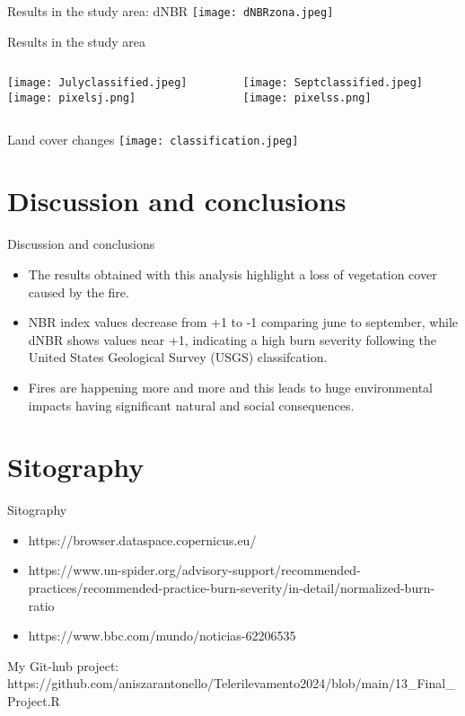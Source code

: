 \documentclass{beamer}
\begin{document}
\begin{frame}{Results in the study area: dNBR}
\texttt{[image: dNBRzona.jpeg]}
\end{frame}

\begin{frame}{Results in the study area}
\begin{columns}
    \begin{column}{0.5\textwidth}
        \texttt{[image: Julyclassified.jpeg]}
        \texttt{[image: pixelsj.png]}
    \end{column}
    \begin{column}{0.5\textwidth}
    \texttt{[image: Septclassified.jpeg]}
    \texttt{[image: pixelss.png]}
    \end{column}
\end{columns}
\end{frame}

\begin{frame}{Land cover changes}
\texttt{[image: classification.jpeg]}
\end{frame}


\section{Discussion and conclusions}
\begin{frame}{Discussion and conclusions}
\begin{itemize}
    \item The results obtained with this analysis highlight a loss of vegetation cover caused by the fire.
    \item NBR index values decrease from +1 to -1 comparing june to september, while dNBR shows values near +1, indicating a high burn severity following the United States Geological Survey (USGS) classifcation.  
    \item Fires are happening more and more and this leads to huge environmental impacts having significant natural and social consequences.
\end{itemize}
    
\end{frame}

\section{Sitography}
\begin{frame}{Sitography}
\begin{itemize}
    \item  https://browser.dataspace.copernicus.eu/
    \item  https://www.un-spider.org/advisory-support/recommended-practices/recommended-practice-burn-severity/in-detail/normalized-burn-ratio
    \item  https://www.bbc.com/mundo/noticias-62206535
\end{itemize}
\tiny My Git-hub project: https://github.com/aniszarantonello/Telerilevamento2024/blob/main/13_Final_Project.R %
\end{frame}
\end{document}
